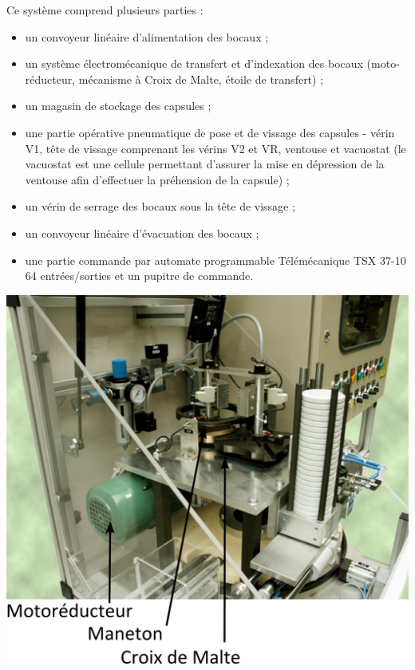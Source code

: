 \vspace{0.5cm}
\begin{minipage}[c]{.55\linewidth}
Ce système comprend plusieurs parties :
\begin{itemize}
\item un convoyeur linéaire d'alimentation des bocaux ;
\item un système électromécanique de transfert et d'indexation des bocaux (moto-réducteur, mécanisme à Croix de Malte, étoile de transfert) ;
\item un magasin de stockage des capsules ;
\item une partie opérative pneumatique de pose et de vissage des capsules - vérin V1, tête de vissage comprenant les vérins V2 et VR, ventouse et vacuostat (le vacuostat est une cellule permettant d'assurer la mise en dépression de la ventouse afin d'effectuer la préhension de la capsule) ;
\item un vérin de serrage des bocaux sous la tête de vissage ;
\item un convoyeur linéaire d'évacuation des bocaux ;
\item une partie commande par automate programmable Télémécanique TSX 37-10 64 entrées/sorties et un pupitre de commande.
\end{itemize}

\end{minipage} \hfill
\begin{minipage}[c]{.4\linewidth}
\begin{center}
 \includegraphics[width=\textwidth]{png/systeme3}
\end{center}
\end{minipage}

